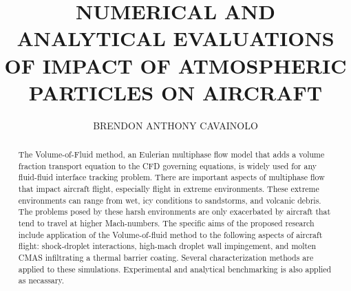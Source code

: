 \documentclass{UCF_ETD}
\title{NUMERICAL AND ANALYTICAL EVALUATIONS OF IMPACT OF ATMOSPHERIC PARTICLES ON AIRCRAFT} %
\author{BRENDON ANTHONY CAVAINOLO} %
\begin{document}
\frontmatter

\maketitle


\begin{abstract}
\label{sec:abstract}
The Volume-of-Fluid method, an Eulerian multiphase flow model that adds a volume fraction transport equation to the CFD governing equations, is widely used for any fluid-fluid interface tracking problem. There are important aspects of multiphase flow that impact aircraft flight, especially flight in extreme environments. These extreme environments can range from wet, icy conditions to sandstorms, and volcanic debris. The problems posed by these harsh environments are only exacerbated by aircraft that tend to travel at higher Mach-numbers. The specific aims of the proposed research include application of the Volume-of-fluid method to the following aspects of aircraft flight: shock-droplet interactions, high-mach droplet wall impingement, and molten CMAS infiltrating a thermal barrier coating. Several characterization methods are  applied to these simulations. Experimental and analytical benchmarking is also applied as necassary.
\end{abstract}



\tableofcontents

\listoffigures

\listoftables
\end{document}
